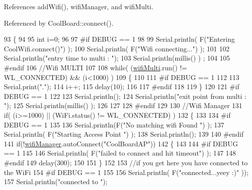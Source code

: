 References add\+Wifi(), wifi\+Manager, and wifi\+Multi.



Referenced by Cool\+Board\+::connect().


\begin{DoxyCode}
93 \{       
94 
95     \textcolor{keywordtype}{int} i=0;
96 
97 \textcolor{preprocessor}{#if DEBUG == 1 }
98 
99     Serial.println( F(\textcolor{stringliteral}{"Entering CoolWifi.connect()"}) );
100     Serial.println( F(\textcolor{stringliteral}{"Wifi connecting..."}) );
101     
102     Serial.println(\textcolor{stringliteral}{"entry time to multi : "});
103     Serial.println(millis() ) ;
104 
105 \textcolor{preprocessor}{#endif}
106     \textcolor{comment}{//Wifi MULTI}
107 
108     \textcolor{keywordflow}{while}( (\hyperlink{classCoolWifi_a7862a8c0d7239877e2956c14a368aab8}{wifiMulti}.run() != WL\_CONNECTED) && (i<1000)  ) 
109     \{
110 
111 \textcolor{preprocessor}{    #if DEBUG == 1}
112 
113             Serial.print(\textcolor{stringliteral}{"."});
114         i++;
115         delay(10);
116     
117 \textcolor{preprocessor}{    #endif}
118 
119         \}   
120 
121 \textcolor{preprocessor}{#if DEBUG == 1 }
122 
123     Serial.println();   
124     Serial.println(\textcolor{stringliteral}{"exit point from multi : "});
125     Serial.println(millis() );
126 
127 
128 \textcolor{preprocessor}{#endif}
129 
130     \textcolor{comment}{//Wifi Manager}
131     \textcolor{keywordflow}{if}( (i>=1000) ||  (WiFi.status() != WL\_CONNECTED) ) 
132     \{
133     
134 \textcolor{preprocessor}{    #if DEBUG == 1 }
135         
136         Serial.println(F(\textcolor{stringliteral}{"No matching wifi Found "}) );
137         Serial.println( F(\textcolor{stringliteral}{"Starting Access Point "}) );  
138         Serial.println();
139     
140 \textcolor{preprocessor}{    #endif}
141         \textcolor{keywordflow}{if}(!\hyperlink{classCoolWifi_a80dd24fdc56e863f5eb9947dd65a433a}{wifiManager}.autoConnect(\textcolor{stringliteral}{"CoolBoardAP"})) 
142         \{
143         
144 \textcolor{preprocessor}{        #if DEBUG == 1}
145 
146             Serial.println( F(\textcolor{stringliteral}{"failed to connect and hit timeout"}) );
147         
148 \textcolor{preprocessor}{        #endif}
149             delay(300);
150 
151         \} 
152 
153           \textcolor{comment}{//if you get here you have connected to the WiFi}
154 \textcolor{preprocessor}{        #if DEBUG == 1}
155 
156             Serial.println( F(\textcolor{stringliteral}{"connected...yeey :)"} ));
157             Serial.println(\textcolor{stringliteral}{"connected to "});

\end{DoxyCode}
